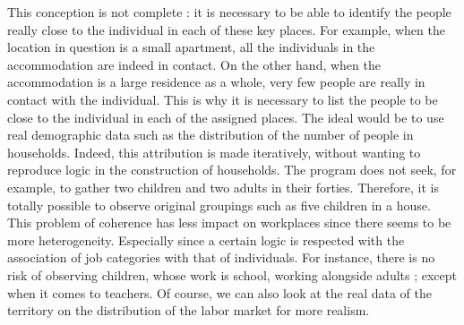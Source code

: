 This conception is not complete : it is necessary to be able to identify the people really close to the individual in each of these key places. For example, when the location in question is a small apartment, all the individuals in the accommodation are indeed in contact. On the other hand, when the accommodation is a large residence as a whole, very few people are really in contact with the individual. This is why it is necessary to list the people to be close to the individual in each of the assigned places. The ideal would be to use real demographic data such as the distribution of the number of people in households. Indeed, this attribution is made iteratively, without wanting to reproduce logic in the construction of households. The program does not seek, for example, to gather two children and two adults in their forties. Therefore, it is totally possible to observe original groupings such as five children in a house. This problem of coherence has less impact on workplaces since there seems to be more heterogeneity. Especially since a certain logic is respected with the association of job categories with that of individuals. For instance, there is no risk of observing children, whose work is school, working alongside adults ; except when it comes to teachers. Of course, we can also look at the real data of the territory on the distribution of the labor market for more realism.

